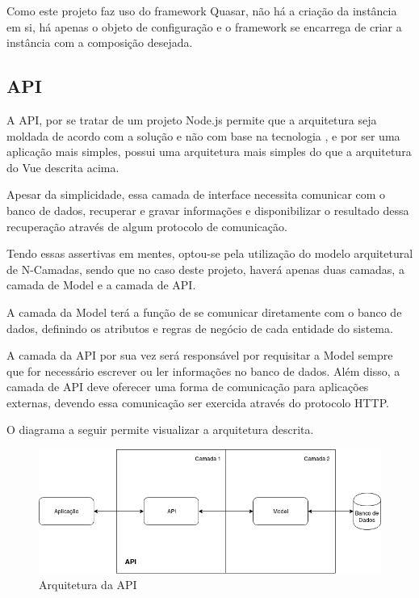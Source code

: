 \begin{apendicesenv}
Como este projeto faz uso do framework Quasar, não há a criação da instância em si, há apenas o objeto de configuração e o framework se encarrega de criar a instância com a composição desejada.\cite{vuejs}

\subsection{API}
A API, por se tratar de um projeto Node.js permite que a arquitetura seja moldada de acordo com a solução e não com base na tecnologia \cite{nodejs}, e por ser uma aplicação mais simples, possui uma arquitetura mais simples do que a arquitetura do Vue descrita acima. 

Apesar da simplicidade, essa camada de interface necessita comunicar com o banco de dados, recuperar e gravar informações e disponibilizar o resultado dessa recuperação através de algum protocolo de comunicação. 

Tendo essas assertivas em mentes, optou-se pela utilização do modelo arquitetural de N-Camadas, sendo que no caso deste projeto, haverá apenas duas camadas, a camada de Model e a camada de API.

A camada da Model terá a função de se comunicar diretamente com o banco de dados, definindo os atributos e regras de negócio de cada entidade do sistema.

A camada da API por sua vez será responsável por requisitar a Model sempre que for necessário escrever ou ler informações no banco de dados. Além disso, a camada de API deve oferecer uma forma de comunicação para aplicações externas, devendo essa comunicação ser exercida através do protocolo HTTP.

O diagrama a seguir permite visualizar a arquitetura descrita.

\begin{figure}[!ht]
	\centering
		\includegraphics[scale=0.5]{figuras/software/8-api-arquitetura.png}
	\caption{Arquitetura da API}
\end{figure}


\end{apendicesenv}

